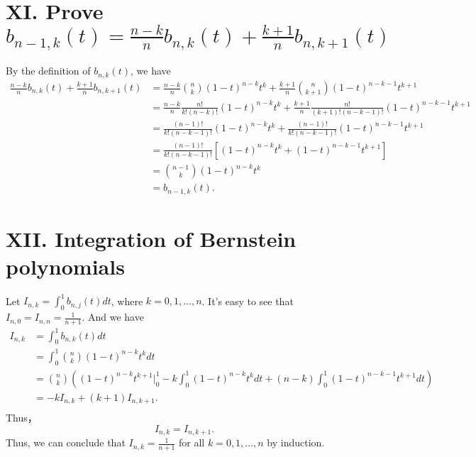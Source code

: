 \documentclass[a4paper]{article}
\begin{document}
\section*{XI. Prove $b_{n-1,k}(t) = \frac{n-k}{n}b_{n,k}(t) + \frac{k+1}{n}b_{n,k+1}(t)$
}

By the definition of $b_{n,k}(t)$, we have
\begin{align*}
    \frac{n-k}{n}b_{n,k}(t) + \frac{k+1}{n}b_{n,k+1}(t) &= \frac{n-k}{n}\binom{n}{k}(1-t)^{n-k}t^k + \frac{k+1}{n}\binom{n}{k+1}(1-t)^{n-k-1}t^{k+1} \\
    &= \frac{n-k}{n}\frac{n!}{k!(n-k)!}(1-t)^{n-k}t^k + \frac{k+1}{n}\frac{n!}{(k+1)!(n-k-1)!}(1-t)^{n-k-1}t^{k+1} \\
    &= \frac{(n-1)!}{k!(n-k-1)!}(1-t)^{n-k}t^k +\frac{(n-1)!}{k!(n-k-1)!}(1-t)^{n-k-1}t^{k+1} \\
    &= \frac{(n-1)!}{k!(n-k-1)!}[(1-t)^{n-k}t^k + (1-t)^{n-k-1}t^{k+1}] \\
    &= \binom{n-1}{k}(1-t)^{n-k}t^k \\
    &= b_{n-1,k}(t).
\end{align*}

\section*{XII. Integration of Bernstein polynomials}
Let $I_{n,k} = \int_{0}^{1}b_{n,j}(t)dt$, where $k = 0,1,\dots,n$. It's easy to see that $I_{n,0} = I_{n,n} = \frac{1}{n+1}$.
And we have
\begin{align*}
    I_{n,k} &= \int_{0}^{1}b_{n,k}(t)dt \\ &= \int_{0}^{1}\binom{n}{k}(1-t)^{n-k}t^kdt\\
    &=\binom{n}{k}\left((1-t)^{n-k}t^{k+1}\bigg|^1_0 - k  \int_{0}^{1}(1-t)^{n-k}t^kdt + (n-k)\int_{0}^{1}(1-t)^{n-k-1}t^{k+1}dt\right)\\
    &= -kI_{n,k} + (k+1)I_{n,k+1}.\\
\end{align*}
Thus，\[
I_{n,k} = I_{n,k+1}.
\]
Thus, we can conclude that $I_{n,k} = \frac{1}{n+1}$ for all $k = 0,1,\dots,n$ by induction.

\end{document}
